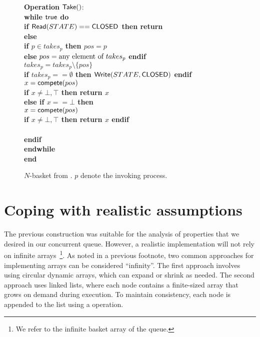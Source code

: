 \begin{figure}[ht!]
{{\begin{minipage}[t]{180mm}
\begin{tabbing}
{\bf Operation} ${\sf Take}()$: \\
 \> {\bf while \({\sf true}\) do}\\
 \> \> {\bf if \({\sf Read}(STATE) == {\sf CLOSED}\) then return \closed} \\
 \> \> {\bf else} \\
 \> \> \> {\bf if \(p \in takes_p\) then \(pos = p\)} \\
 \> \> \> {\bf else} \(pos = \hbox{any element of } takes_p\) {\bf endif} \\
 \> \> \> \(takes_p =  takes_p \setminus \{pos\}\) \\
 \> \> \> {\bf if \(takes_p == \emptyset\) then \({\sf Write}(STATE, {\sf CLOSED})\) endif} \\
 \> \> \> \( x = {\sf compete}(pos) \) \\
 \> \> \> {\bf if \(x \neq \bot, \top \) then return \(x\)} \\
 \> \> \> {\bf else if \(x == \bot\) then} \\
 \> \> \> \> \( x = {\sf compete}(pos) \) \\
 \> \> \> \> {\bf if \(x \neq \bot, \top \) then return \(x\) endif} \\
 \> \>  \\
 \> \> {\bf endif} \\
 \> {\bf endwhile}\\
{\bf end \Take}
\end{tabbing}
\end{minipage}}
\caption{\label{basket-2}$N$-basket from \CAS. $p$ denote the invoking process.}
}
\end{figure}

\section{Coping with realistic assumptions}

The previous construction was suitable for the analysis of properties that we desired in our concurrent queue. However, a realistic implementation will not rely on infinite arrays~\footnote{We refer to the infinite basket array of the queue.}. As noted in a previous footnote, two common approaches for implementing arrays can be considered ``infinity''. The first approach involves using circular dynamic arrays, which can expand or shrink as needed. The second approach uses linked lists, where each node contains a finite-sized array that grows on demand during execution. To maintain consistency, each node is appended to the list using a \CAS operation.

